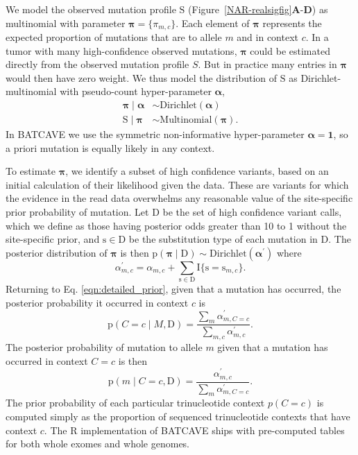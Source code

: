 \documentclass[a4,center,fleqn]{NAR}
\newcommand{\batcave}{BATCAVE\xspace}
\begin{document}
We model the observed mutation profile $\mathrm{S}$ (Figure~\ref{NAR-realsigfig}\textbf{A}-\textbf{D}) as multinomial with parameter $\boldsymbol{\pi} = \{\pi_{m,c}\}$.
Each element of $\boldsymbol{\pi}$ represents the expected proportion of mutations that are to allele $m$ and in context $c$.
In a tumor with many high-confidence observed mutations, $\boldsymbol{\pi}$ could be estimated directly from the observed mutation profile $S$.
But in practice many entries in $\boldsymbol{\pi}$ would then have zero weight.
We thus model the distribution of $\mathrm{S}$ as Dirichlet-multinomial with pseudo-count hyper-parameter $\boldsymbol{\alpha}$, 
\begin{equation}
\begin{aligned}
  \boldsymbol{\pi} \mid \boldsymbol{\alpha} &\sim \textrm{Dirichlet}(\boldsymbol{\alpha}) \\
  \mathrm{S} \mid \boldsymbol{\pi} & \sim \textrm{Multinomial}(\boldsymbol{\pi}).
\end{aligned}
\end{equation}
In \batcave we use the symmetric non-informative hyper-parameter $\boldsymbol{\alpha} = \boldsymbol{1}$, so a priori mutation is equally likely in any context.

To estimate $\boldsymbol{\pi}$, we identify a subset of high confidence variants, based on an initial calculation of their likelihood given the data.
These are variants for which the evidence in the read data overwhelms any reasonable value of the site-specific prior probability of mutation.
Let $\mathrm{D}$ be the set of high confidence variant calls, which we define as those having posterior odds greater than 10 to 1 without the site-specific prior, and $\mathrm{s} \in \mathrm{D}$ be the substitution type of each mutation in $\mathrm{D}$.
The posterior distribution of $\boldsymbol{\pi}$ is then $\mathrm{p}(\boldsymbol{\pi} \mid \mathrm{D}) \sim \textrm{Dirichlet}(\boldsymbol{\alpha^{\prime}})$ where
\begin{equation}
    \alpha^{\prime}_{m,c} = \alpha_{m,c} + \sum\limits_{\mathrm{s} \in \mathrm{D}} \mathrm{I}\{\mathrm{s} = \mathrm{s}_{m,c}\}.
\end{equation}
Returning to Eq. \ref{eqn:detailed_prior}, given that a mutation has occurred, the posterior probability it occurred in context $c$ is
\begin{equation}
  \label{eqn:post_pred}
  \mathrm{p}(C = c \mid M,\mathrm{D}) = \frac{\sum_{m}\alpha^{\prime}_{m,C = c}}{\sum_{m,c}\alpha^{\prime}_{m,c}}.
\end{equation}
The posterior probability of mutation to allele $m$ given that a mutation has occurred in context $C = c$ is then
\begin{equation}
  \label{eqn:to_allele}
   \mathrm{p}(m \mid C = c,\mathrm{D}) = \frac{\alpha^{\prime}_{m,c}}{\sum_{m} \alpha^{\prime}_{m,C = c}}.
\end{equation}
The prior probability of each particular trinucleotide context $p(C = c)$ is computed simply as the proportion of sequenced trinucleotide contexts that have context $c$.
The R implementation of \batcave ships with pre-computed tables for both whole exomes and whole genomes.
\end{document}
